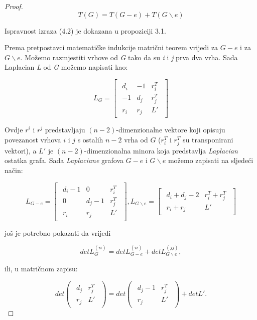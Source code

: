 \documentclass[times, utf8, zavrsni]{fer}
\begin{document}
\begin{proof}
\begin{equation}
	T(G) = T(G - e) + T(G \backslash e)
\end{equation}

Ispravnost izraza (4.2) je dokazana u propoziciji 3.1.

Prema pretpostavci matematičke indukcije matrični teorem vrijedi za $G - e$ i za $G \backslash e$. Možemo razmjestiti vrhove od \textit{G} tako da su \textit{i} i \textit{j} prva dva vrha. Sada Laplacian \textit{L} od \textit{G} možemo napisati kao:

\[
L_G =
\begin{bmatrix}
	\begin{array}{c|c|c}
		d_i & -1 & r_i^T \\
		\hline
		-1 & d_j & r_j^T \\
		\hline
		r_i & r_j & L'
	\end{array}
\end{bmatrix}
\]

Ovdje $r^i$ i $r^j$ predstavljaju $(n - 2)$-dimenzionalne vektore koji opisuju povezanost vrhova $i$ i $j$ s ostalih $n - 2$ vrha od $G$ ($r_i^T$ i $r_j^T$ su transponirani vektori), a $L'$ je $(n - 2)$-dimenzionalna minora koja predstavlja \textit{Laplacian} ostatka grafa. Sada \textit{Laplaciane} grafova $G - e$ i $G \backslash e$ možemo zapisati na sljedeći način:

\[
L_{G - e} = 
\begin{bmatrix}
	\begin{array}{c|c|c}
		d_i - 1 & 0 & r_i^T \\
		\hline
		0 & d_j - 1 & r_j^T \\
		\hline
		r_i & r_j & L'
	\end{array}
\end{bmatrix},
L_{G \backslash e} = 
\begin{bmatrix}
	\begin{array}{c|c}
		d_i + d_j - 2 & r_i^T + r_j^T \\
		\hline
		r_i + r_j & L'
	\end{array}
\end{bmatrix}
\]

još je potrebno pokazati da vrijedi

\begin{equation}
	detL_G^{(ii)} = detL_{G - e}^{(ii)} + detL_{G \backslash e}^{(jj)},
\end{equation}

ili, u matričnom zapisu:

\[
det
\begin{pmatrix}
	\begin{array}{c|c}
		d_j & r_j^T \\
		\hline
		r_j & L'
	\end{array}
\end{pmatrix}
= det
\begin{pmatrix}
	\begin{array}{c|c}
		d_j - 1 & r_j^T \\
		\hline
		r_j & L'
	\end{array}
\end{pmatrix}
+ detL'.
\]


\end{proof}
\end{document}
